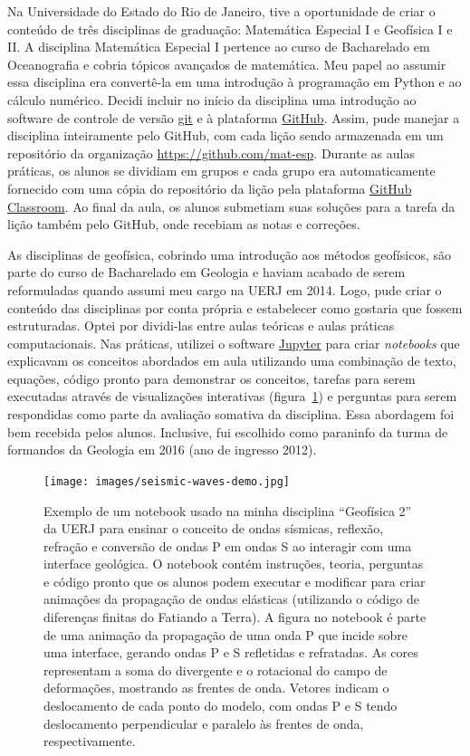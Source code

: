 \documentclass[12pt,a4paper,oneside]{book}
\newcommand{\UERJ}{Universidade do Estado do Rio de Janeiro}
\begin{document}
Na \UERJ{}, tive a oportunidade de criar o conteúdo de três disciplinas de
graduação: Matemática Especial I e Geofísica I e II.
A disciplina Matemática Especial I pertence ao curso de Bacharelado em
Oceanografia e cobria tópicos avançados de matemática.
Meu papel ao assumir essa disciplina era convertê-la em uma introdução à
programação em Python e ao cálculo numérico.
Decidi incluir no início da disciplina uma introdução ao software de controle
de versão \href{https://git-scm.com/}{git} e à plataforma
\href{https://github.com/}{GitHub}.
Assim, pude manejar a disciplina inteiramente pelo GitHub, com cada lição
sendo armazenada em um repositório da organização
\url{https://github.com/mat-esp}.
Durante as aulas práticas, os alunos se dividiam em grupos e cada grupo era
automaticamente fornecido com uma cópia do repositório da lição pela plataforma
\href{https://classroom.github.com/}{GitHub Classroom}.
Ao final da aula, os alunos submetiam suas soluções para a tarefa da lição
também pelo GitHub, onde recebiam as notas e correções.

As disciplinas de geofísica, cobrindo uma introdução aos métodos geofísicos,
são parte do curso de Bacharelado em Geologia e haviam acabado de serem
reformuladas quando assumi meu cargo na UERJ em 2014.
Logo, pude criar o conteúdo das disciplinas por conta própria e estabelecer
como gostaria que fossem estruturadas.
Optei por dividi-las entre aulas teóricas e aulas práticas computacionais.
Nas práticas, utilizei o software \href{https://jupyter.org/}{Jupyter} para
criar \textit{notebooks} que explicavam os conceitos abordados em aula
utilizando uma combinação de texto, equações, código pronto para demonstrar os
conceitos, tarefas para serem executadas através de visualizações interativas
(figura~\ref{fig_notebooksismica}) e perguntas para serem respondidas como
parte da avaliação somativa da disciplina.
Essa abordagem foi bem recebida pelos alunos.
Inclusive, fui escolhido como paraninfo da turma de formandos da Geologia em
2016 (ano de ingresso 2012).

\begin{figure}[t]
  \begin{center}
    \texttt{[image: images/seismic-waves-demo.jpg]}
  \end{center}
  \caption{
    Exemplo de um notebook usado na minha disciplina ``Geofísica 2'' da UERJ
    para ensinar o conceito de ondas sísmicas, reflexão, refração e conversão
    de ondas P em ondas S ao interagir com uma interface geológica. O notebook
    contém instruções, teoria, perguntas e código pronto que os alunos
    podem executar e modificar para criar animações da propagação de ondas
    elásticas (utilizando o código de diferenças finitas do Fatiando a Terra).
    A figura no notebook é parte de uma animação da propagação de uma onda P
    que incide sobre uma interface, gerando ondas P e S refletidas e
    refratadas.
    As cores representam a soma do divergente e o rotacional do campo de
    deformações, mostrando as frentes de onda.
    Vetores indicam o deslocamento de cada ponto do modelo, com ondas P e S
    tendo deslocamento perpendicular e paralelo às frentes de onda,
    respectivamente.
  }
  \label{fig_notebooksismica}
\end{figure}
\end{document}

